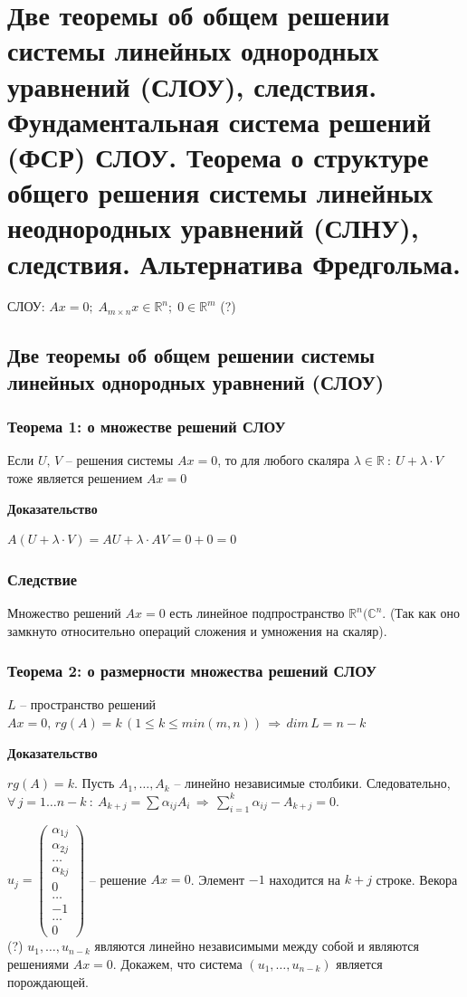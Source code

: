 \documentclass{article}
\newcommand{\R}{\mathbb R}
\begin{document}
\newpage
\section{Две теоремы об общем решении системы линейных однородных уравнений (СЛОУ), следствия. Фундаментальная система решений (ФСР) СЛОУ. Теорема о структуре общего решения системы линейных неоднородных уравнений (СЛНУ), следствия. Альтернатива Фредгольма.}
СЛОУ: $Ax=0;\;A_{m\times n}x\in \R^n;\;0\in \R^m$ (?)
\subsection{Две теоремы об общем решении системы линейных однородных уравнений (СЛОУ)}
\subsubsection{Теорема 1: о множестве решений СЛОУ}
Если $U,\,V$ -- решения системы $Ax=0$, то для любого скаляра $\lambda\in\R\::\:U+\lambda\cdot V$ тоже является решением $Ax=0$

\textbf{Доказательство}

$A(U+\lambda\cdot V)=AU+\lambda\cdot AV = 0+0=0$

\subsubsection{Следствие}

Множество решений $Ax=0$ есть линейное подпространство $\R^n(\mathbb{C}^n$.
(Так как оно замкнуто относительно операций сложения и умножения на скаляр).
\subsubsection{Теорема 2: о размерности множества решений СЛОУ}
$L$ -- пространство решений $Ax=0,\,rg(A)=k\,(1\leqslant k\leqslant min(m,n))\,\Rightarrow\,dim\,L=n-k$

\textbf{Доказательство}

$rg(A)=k$. Пусть $A_1,\ldots,A_k$ -- линейно независимые столбики. Следовательно, $\forall\,j=1\ldots n-k\::\: A_{k+j}=\sum\alpha_{ij}A_i\,\Rightarrow\,\sum\limits_{i=1}^k \alpha_{ij}-A_{k+j}=0$.

$
u_j=\begin{pmatrix} \alpha_{1j}\\ \alpha_{2j} \\ \ldots \\ \alpha_{kj} \\ 0 \\ \ldots \\ -1 \\ \ldots \\ 0 \end{pmatrix}
$ -- решение $Ax=0$. Элемент $-1$ находится на $k+j$ строке. 
\newpage
Векора (?) $u_1,\ldots,u_{n-k}$ являются линейно независимыми между собой и являются решениями $Ax=0$. Докажем, что система $(u_1,\ldots,u_{n-k})$ является порождающей.
\end{document}

